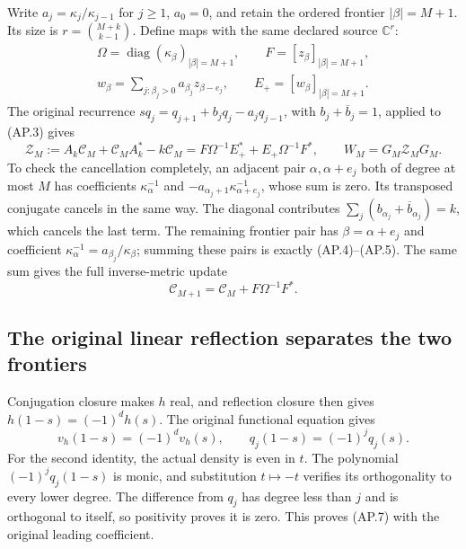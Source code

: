Write \(a_j=\kappa_j/\kappa_{j-1}\) for \(j\ge1\),
\(a_0=0\), and retain the ordered frontier \(|\beta|=M+1\).
Its size is \(r=\binom{M+k}{k-1}\).  Define maps with the
same declared source \(\mathbb C^r\):
\[
 \begin{gathered}
 \Omega=\operatorname{diag}(\kappa_\beta)_{|\beta|=M+1},\qquad
 F=[z_\beta]_{|\beta|=M+1},\\
 w_\beta=\sum_{j:\beta_j>0}a_{\beta_j}z_{\beta-e_j},\qquad
 E_+=[w_\beta]_{|\beta|=M+1}.
 \end{gathered}
 \tag{AP.4}
\]
The original recurrence
\(sq_j=q_{j+1}+b_jq_j-a_jq_{j-1}\), with
\(b_j+\overline b_j=1\), applied to (AP.3) gives
\[
 \mathcal Z_M:=A_k\mathcal C_M+\mathcal C_MA_k^*-k\mathcal C_M
       =F\Omega^{-1}E_+^*+E_+\Omega^{-1}F^*,
 \qquad W_M=G_M\mathcal Z_MG_M.
 \tag{AP.5}
\]
To check the cancellation completely, an adjacent pair
\(\alpha,\alpha+e_j\) both of degree at most \(M\)
has coefficients \(\kappa_\alpha^{-1}\) and
\(-a_{\alpha_j+1}\kappa_{\alpha+e_j}^{-1}\), whose
sum is zero.  Its transposed conjugate cancels in the same way.
The diagonal contributes
\(\sum_j(b_{\alpha_j}+\overline b_{\alpha_j})=k\),
which cancels the last term.  The remaining frontier pair has
\(\beta=\alpha+e_j\) and coefficient
\(\kappa_\alpha^{-1}=a_{\beta_j}/\kappa_\beta\);
summing these pairs is exactly (AP.4)--(AP.5).
The same sum gives the full inverse-metric update
\[
 \mathcal C_{M+1}=\mathcal C_M+F\Omega^{-1}F^*.
 \tag{AP.6}
\]

\subsection{The original linear reflection separates the two frontiers}

Conjugation closure makes \(h\) real, and reflection closure
then gives \(h(1-s)=(-1)^dh(s)\).  The original functional
equation gives
\[
 v_h(1-s)=(-1)^dv_h(s),\qquad
 q_j(1-s)=(-1)^jq_j(s).
 \tag{AP.7}
\]
For the second identity, the actual density is even in \(t\).
The polynomial \((-1)^jq_j(1-s)\) is monic, and substitution
\(t\mapsto-t\) verifies its orthogonality to every lower
degree.  The difference from \(q_j\) has degree less than
\(j\) and is orthogonal to itself, so positivity proves it is
zero.  This proves (AP.7) with the original leading coefficient.

